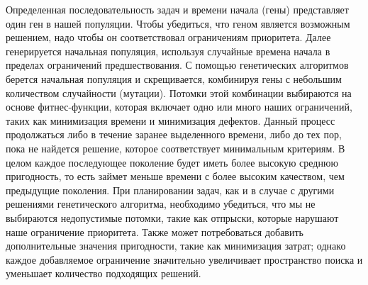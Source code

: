 Определенная последовательность задач и времени начала (гены) представляет один ген в нашей популяции. Чтобы убедиться, что геном является возможным решением, надо чтобы он соответствовал ограничениям приоритета. Далее генерируется начальная популяция, используя случайные времена начала в пределах ограничений предшествования. С помощью генетических алгоритмов берется начальная популяция и скрещивается, комбинируя гены с небольшим количеством случайности (мутации). Потомки этой комбинации выбираются на основе фитнес-функции, которая включает одно или много наших ограничений, таких как минимизация времени и минимизация дефектов. Данный процесс продолжаться либо в течение заранее выделенного времени, либо до тех пор, пока не найдется решение, которое соответствует минимальным критериям. В целом каждое последующее поколение будет иметь более высокую среднюю пригодность, то есть займет меньше времени с более высоким качеством, чем предыдущие поколения. При планировании задач, как и в случае с другими решениями генетического алгоритма, необходимо убедиться, что мы не выбираются недопустимые потомки, такие как отпрыски, которые нарушают наше ограничение приоритета. Также может потребоваться добавить дополнительные значения пригодности, такие как минимизация затрат; однако каждое добавляемое ограничение значительно увеличивает пространство поиска и уменьшает количество подходящих решений.
